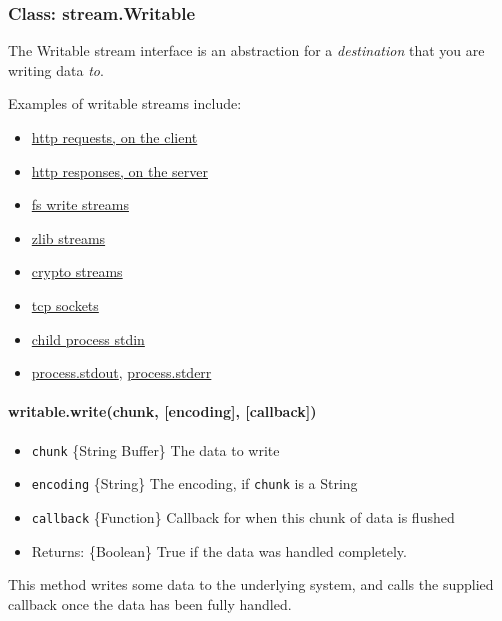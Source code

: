 \subsubsection{Class: stream.Writable}

The Writable stream interface is an abstraction for a \emph{destination}
that you are writing data \emph{to}.

Examples of writable streams include:

\begin{itemize}
\item
  \href{http.html\#http\_class\_http\_clientrequest}{http requests, on
  the client}
\item
  \href{http.html\#http\_class\_http\_serverresponse}{http responses, on
  the server}
\item
  \href{fs.html\#fs\_class\_fs\_writestream}{fs write streams}
\item
  \href{zlib.html}{zlib streams}
\item
  \href{crypto.html}{crypto streams}
\item
  \href{net.html\#net\_class\_net\_socket}{tcp sockets}
\item
  \href{child\_process.html\#child\_process\_child\_stdin}{child process
  stdin}
\item
  \href{process.html\#process\_process\_stdout}{process.stdout},
  \href{process.html\#process\_process\_stderr}{process.stderr}
\end{itemize}

\paragraph{writable.write(chunk, {[}encoding{]}, {[}callback{]})}

\begin{itemize}
\item
  \texttt{chunk} \{String \textbar{} Buffer\} The data to write
\item
  \texttt{encoding} \{String\} The encoding, if \texttt{chunk} is a
  String
\item
  \texttt{callback} \{Function\} Callback for when this chunk of data is
  flushed
\item
  Returns: \{Boolean\} True if the data was handled completely.
\end{itemize}

This method writes some data to the underlying system, and calls the
supplied callback once the data has been fully handled.

